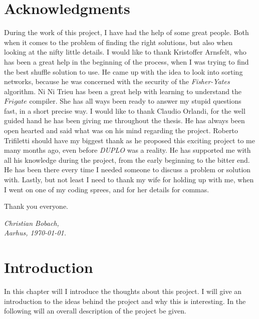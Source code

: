 \documentclass[twoside,11pt,openright]{report}
\newcommand{\FY}{\textit{Fisher-Yates} }
\newcommand{\DUPLO}{\textit{DUPLO} }
\begin{document}
\chapter*{Acknowledgments}
During the work of this project, I have had the help of some great people. Both when it comes to the problem of finding the right solutions, but also when looking at the nifty little details. I would like to thank Kristoffer Arnsfelt, who has been a great help in the beginning of the process, when I was trying to find the best shuffle solution to use. He came up with the idea to look into sorting networks, because he was concerned with the security of the \FY algorithm. Ni Ni Trieu has been a great help with learning to understand the $Frigate$ compiler. She has all ways been ready to answer my stupid questions fast, in a short precise way. I would like to thank Claudio Orlandi, for the well guided hand he has been giving me throughout the thesis. He has always been open hearted and said what was on his mind regarding the project. Roberto Trifiletti should have my biggest thank as he proposed this exciting project to me many months ago, even before \DUPLO was a reality. He has supported me with all his knowledge during the project, from the early beginning to the bitter end. He has been there every time I needed someone to discuss a problem or solution with. Lastly, but not least I need to thank my wife for holding up with me, when I went on one of my coding sprees, and for her details for commas.

Thank you everyone.

\vspace{2ex}
\begin{flushright}
  \emph{Christian Bobach,}\\
  \emph{Aarhus, \today.}
\end{flushright}

\tableofcontents
{}
\setcounter{secnumdepth}{2}

\chapter{Introduction}
\label{ch:intro}

In this chapter will I introduce the thoughts about this project. I will give an introduction to the ideas behind the project and why this is interesting. In the following will an overall description of the project be given.
\end{document}
